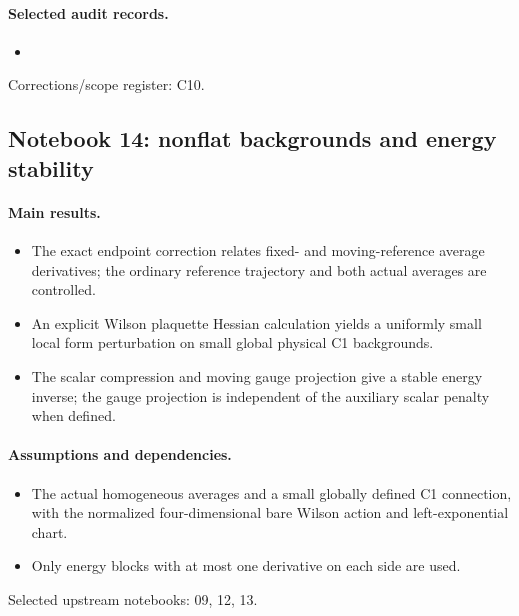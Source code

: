 \paragraph{Selected audit records.}
\begingroup\small
\begin{itemize}
\item {}
\end{itemize}
\endgroup
Corrections/scope register: C10.\par

\subsection{Notebook 14: nonflat backgrounds and energy stability}
\label{hnc-14}
\noindent{}\par

\paragraph{Main results.}
\begin{itemize}
\item The exact endpoint correction relates fixed- and moving-reference average derivatives; the ordinary reference trajectory and both actual averages are controlled.
\item An explicit Wilson plaquette Hessian calculation yields a uniformly small local form perturbation on small global physical C1 backgrounds.
\item The scalar compression and moving gauge projection give a stable energy inverse; the gauge projection is independent of the auxiliary scalar penalty when defined.
\end{itemize}

\paragraph{Assumptions and dependencies.}
\begin{itemize}
\item The actual homogeneous averages and a small globally defined C1 connection, with the normalized four-dimensional bare Wilson action and left-exponential chart.
\item Only energy blocks with at most one derivative on each side are used.
\end{itemize}

Selected upstream notebooks: 09, 12, 13.\par

